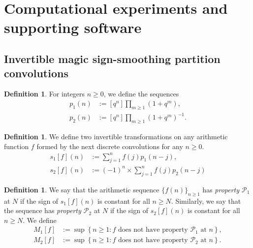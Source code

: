 \documentclass[12pt,reqno,a4letter]{article}
\numberwithin{figure}{section}
\numberwithin{table}{section}
\numberwithin{equation}{section}
\newcommand{\seqnum}[1]{\href{http://oeis.org/#1}{\color{ProcessBlue}{\underline{#1}}}}
\theoremstyle{plain}
\numberwithin{theorem}{section}
\theoremstyle{definition}
\newtheorem{definition}[theorem]{Definition}
\begin{document}
\section{Computational experiments and supporting software}

\subsection{Invertible magic sign-smoothing partition convolutions}

\begin{definition}
\label{def_p1np2n_magicPartFnSeqs_v1}
For integers $n \geq 0$, we define the sequences 
\cite[\seqnum{A000009}; \seqnum{A081362}]{OEIS} 
\begin{align*}
p_1(n) & := [q^n] \prod_{m \geq 1} (1+q^m), \\ 
p_2(n) & := [q^n] \prod_{m \geq 1} (1+q^m)^{-1}. 
\end{align*}
\end{definition}

\begin{definition}
\label{def_s1s2fn_cvlTfSeqs_v1} 
We define two invertible transformations on any arithmetic function $f$ formed by the 
next discrete convolutions for any $n \geq 0$. 
\begin{align*} 
s_1[f](n) & := \sum_{j=1}^{n} f(j) p_1(n-j), \\ 
s_2[f](n) & := (-1)^n \times \sum_{j=1}^{n} f(j) p_2(n-j) 
\end{align*}
\end{definition}

\begin{definition}
We say that the arithmetic sequence $\{f(n)\}_{n \geq 1}$ has 
\emph{property $\mathcal{P}_1$} at $N$ if the sign of $s_1[f](n)$ is constant for all $n \geq N$. 
Similarly, we say that the sequence has \emph{property $\mathcal{P}_2$} at $N$ if the sign of 
$s_2[f](n)$ is constant for all $n \geq N$. We define 
\begin{align*} 
M_{1}[f] & := \sup \left\{n \geq 1: f \text{\ does not have property\ } \mathcal{P}_1 \text{\ at\ } n\right\}, \\ 
M_{2}[f] & := \sup \left\{n \geq 1: f \text{\ does not have property\ } \mathcal{P}_2 \text{\ at\ } n\right\}. 
\end{align*} 
\end{definition} 
\end{document}
